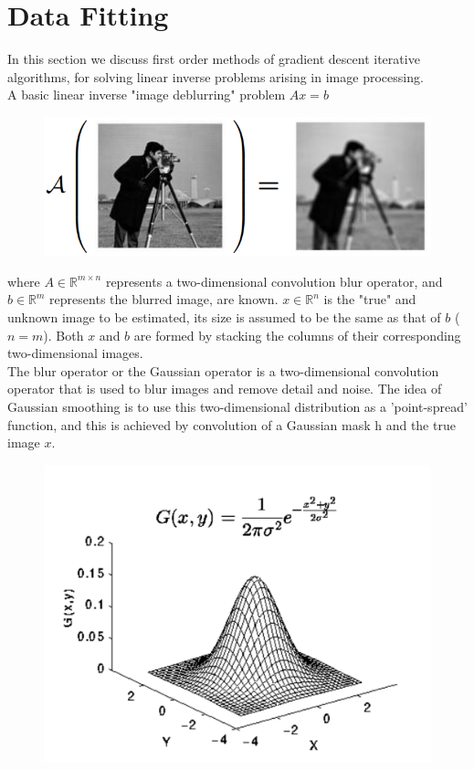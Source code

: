 \documentclass[12pt]{article}
\begin{document}
\section{Data Fitting}
In this section we discuss first order methods of gradient descent iterative algorithms, for solving linear inverse problems arising in image processing.\\
A basic linear inverse "image deblurring" problem $Ax=b$
\begin{figure}[H]
\centering
\includegraphics[scale=0.5]{df.PNG}
\end{figure}
where $A \in \mathbb{R}^{m \times n}$ represents a two-dimensional convolution blur operator, and $b \in \mathbb{R}^m$ represents the blurred image, are known. $x \in \mathbb{R}^n$ is the "true" and unknown image to be estimated, its size is assumed to be the same as that of $b$ ($n=m$). Both $x$ and $b$ are formed by stacking the columns of their corresponding two-dimensional images.\\
The blur operator or the Gaussian operator is a two-dimensional convolution operator that is used to blur images and remove detail and noise. The idea of Gaussian smoothing is to use this two-dimensional distribution as a 'point-spread' function, and this is achieved by convolution of a Gaussian mask h and the true image $x$.
\begin{figure}[H]
\centering
\includegraphics[scale=0.3]{gf.PNG}
\end{figure}
\end{document}
